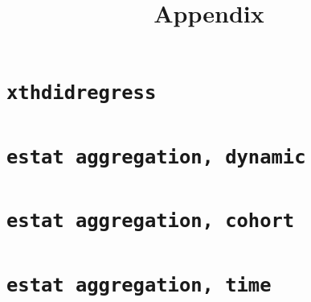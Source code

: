 \documentclass[12pt]{article}
\title{Appendix}
\date{}
\begin{document}
\maketitle
\tableofcontents
\clearpage

\section{{\tt xthdidregress}}
\begin{stlog}

\end{stlog}

\section{{\tt estat aggregation, dynamic}}
\begin{stlog}

\end{stlog}

\section{{\tt estat aggregation, cohort}}
\begin{stlog}

\end{stlog}

\section{{\tt estat aggregation, time}}
\begin{stlog}

\end{stlog}
\end{document}
